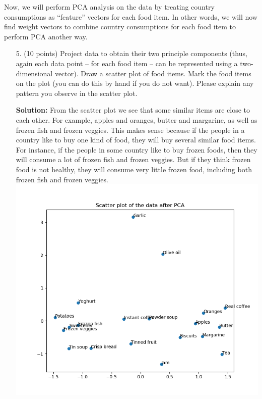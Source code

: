 \documentclass[twoside,12pt]{article}
\begin{document}
Now, we will perform PCA analysis on the data by treating country consumptions as ``feature'' vectors for each food item. In other words, we will now find weight vectors to combine country consumptions for each food item to perform PCA another way.
\begin{enumerate}
\item[5. ] (10 points) Project data to obtain their two principle components (thus, again each data point -- for each food item -- can be represented using a two-dimensional vector). Draw a scatter plot of food items. Mark the food items on the plot (you can do this by hand if you do not want). Please explain any pattern you observe in the scatter plot.
\begin{tcolorbox}
\textbf{Solution:} From the scatter plot we see that some similar items are close to each other. For example, apples and oranges, butter and margarine, as well as frozen fish and frozen veggies.  This makes sense because if the people in a country like to buy one kind of food, they will buy several similar food items. For instance, if the people in some country like to buy frozen foods, then they will consume a lot of frozen fish and frozen veggies. But if they think frozen food is not healthy, they will consume very little frozen food, including both frozen fish and frozen veggies. 
\includegraphics[width=.99\textwidth]{scatter2.png}
\end{tcolorbox}
\end{enumerate}
\end{document}
